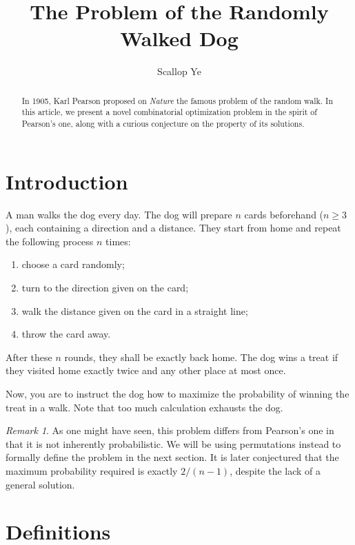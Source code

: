 \documentclass{amsart}
\title{The Problem of the Randomly Walked Dog}
\author{Scallop Ye}
\theoremstyle{definition}
\theoremstyle{problem}
\theoremstyle{remark}
\newtheorem*{remark}{Remark}
\begin{document}
\begin{abstract}
    In 1905, Karl Pearson \cite{pearson} proposed on \emph{Nature} the
    famous problem of the random walk. In this article, we present a novel
    combinatorial optimization problem in the spirit of Pearson's one,
    along with a curious conjecture on the property of its solutions.
\end{abstract}

\maketitle

\section{Introduction}

A man walks the dog every day. The dog will prepare $n$ cards beforehand ($n\ge3$),
each containing a direction and a distance.
They start from home and repeat the following process $n$ times:

\begin{enumerate}
    \item choose a card randomly;
    \item turn to the direction given on the card;
    \item walk the distance given on the card in a straight line;
    \item throw the card away.
\end{enumerate}

After these $n$ rounds, they shall be exactly back home. The dog wins a treat
if they visited home exactly twice and any other place at most once.

Now, you are to instruct the dog how to maximize the probability of winning the
treat in a walk. Note that too much calculation exhausts the dog.

\begin{remark}
    As one might have seen, this problem differs from Pearson’s one in that
    it is not inherently probabilistic. We will be using permutations
    instead to formally define the problem in the next section.
    It is later conjectured that the maximum probability required is exactly
    $2/(n-1)$, despite the lack of a general solution.
\end{remark}

\section{Definitions}
\end{document}
